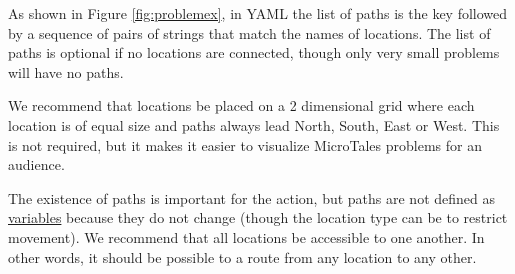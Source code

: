 \documentclass{nilreport}
\begin{document}
As shown in Figure \ref{fig:problemex}, in YAML the list of paths is the key  followed by a sequence of pairs of strings that match the names of locations. The list of paths is optional if no locations are connected, though only very small problems will have no paths.

We recommend that locations be placed on a 2 dimensional grid where each location is of equal size and paths always lead North, South, East or West. This is not required, but it makes it easier to visualize MicroTales problems for an audience.

The existence of paths is important for the  action, but paths are not defined as \hyperref[sec:variables]{variables} because they do not change (though the  location type can be  to restrict movement). We recommend that all locations be accessible to one another. In other words, it should be possible to  a route from any location to any other.




\end{document}
